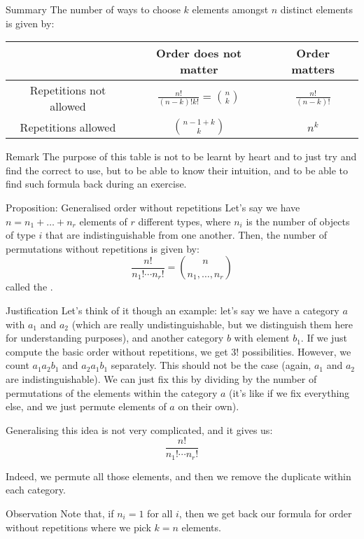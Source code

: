 \documentclass[a4paper]{article}
\begin{document}
\begin{parag}{Summary}
    The number of ways to choose $k$ elements amongst $n$ distinct elements is given by:
    \begin{center}
    \begin{tabular}{|c|c|c|}
        \hline
        & Order does not matter & Order matters \\
        \hline
        Repetitions not allowed & $\displaystyle \frac{n!}{\left(n-k\right)!k!} = \binom{n}{k}$ & $\displaystyle \frac{n!}{\left(n-k\right)!}$ \\
        \hline
        Repetitions allowed & $\displaystyle \binom{n-1 + k}{k}$ & $\displaystyle n^k$ \\
        \hline
    \end{tabular}
    \end{center}

    \begin{subparag}{Remark}
        The purpose of this table is not to be learnt by heart and to just try and find the correct to use, but to be able to know their intuition, and to be able to find such formula back during an exercise.
    \end{subparag}
    
\end{parag}

\begin{parag}{Proposition: Generalised order without repetitions}
    Let's say we have $n = n_1 + \ldots + n_r$ elements of $r$ different types, where $n_i$ is the number of objects of type $i$ that are indistinguishable from one another. Then, the number of permutations without repetitions is given by: 
    \[\frac{n!}{n_1! \cdots n_r!} = \binom{n}{n_1, \ldots, n_r}\]
    called the .
    
    \begin{subparag}{Justification}
        Let's think of it though an example: let's say we have a category $a$ with $a_1$ and $a_2$ (which are really undistinguishable, but we distinguish them here for understanding purposes), and another category $b$ with element $b_1$. If we just compute the basic order without repetitions, we get $3!$ possibilities. However, we count $a_1 a_2 b_1$ and $a_2 a_1 b_1$ separately. This should not be the case (again, $a_1$ and $a_2$ are indistinguishable). We can just fix this by dividing by the number of permutations of the elements within the category $a$ (it's like if we fix everything else, and we just permute elements of $a$ on their own).

        Generalising this idea is not very complicated, and it gives us: 
        \[\frac{n!}{n_1! \cdots n_r!}\]
        
        Indeed, we permute all those elements, and then we remove the duplicate within each category.
    \end{subparag}

    \begin{subparag}{Observation}
         Note that, if $n_i = 1$ for all $i$, then we get back our formula for order without repetitions where we pick $k = n$ elements.
    \end{subparag}
\end{parag}
\end{document}
